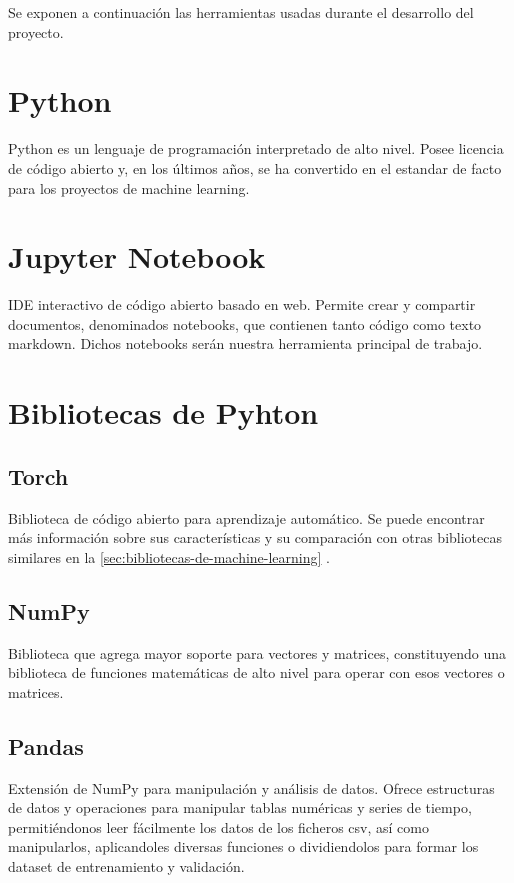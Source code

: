 
Se exponen a continuación las herramientas usadas durante el desarrollo del proyecto.

\section{Python}\label{sec:bibliotecas-de}
Python es un lenguaje de programación interpretado de alto nivel. Posee licencia de código abierto y, en los últimos años, se ha convertido en el estandar de facto para los proyectos de machine learning.

\section{Jupyter Notebook}
IDE interactivo de código abierto basado en web. Permite crear y compartir documentos, denominados notebooks, que contienen tanto código como texto markdown. Dichos notebooks serán nuestra herramienta principal de trabajo. 

\section{Bibliotecas de Pyhton}

\subsection{Torch}
Biblioteca de código abierto para aprendizaje automático. Se puede encontrar más información sobre sus características y su comparación con otras bibliotecas similares en la \autoref{sec:bibliotecas-de-machine-learning} .
 
\subsection{NumPy}
Biblioteca que agrega mayor soporte para vectores y matrices, constituyendo una biblioteca de funciones matemáticas de alto nivel para operar con esos vectores o matrices.

\subsection{Pandas}
Extensión de NumPy para manipulación y análisis de datos. Ofrece estructuras de datos y operaciones para manipular tablas numéricas y series de tiempo, permitiéndonos leer fácilmente los datos de los ficheros csv, así como manipularlos, aplicandoles diversas funciones o dividiendolos para formar los dataset de entrenamiento y validación.

